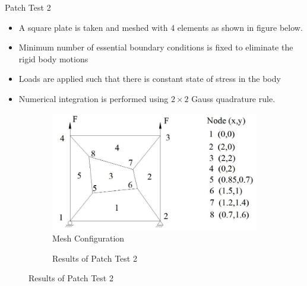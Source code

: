 \documentclass{beamer}
\begin{document}
\begin{frame}[t,fragile]{Patch Test 2}
    \vspace{-.4cm}
    \footnotesize
 \begin{itemize}
        \item A square plate is taken and meshed with 4 elements as shown in figure below. 
        \item Minimum number of essential boundary conditions is fixed to eliminate the rigid body motions
        \item Loads are applied such that there is constant state of stress in the body
        \item Numerical integration is performed using $2\times 2$ Gauss quadrature rule.
    \end{itemize}
    \begin{figure}
    \vspace{.5cm}
\begin{subfigure}{0.45\textwidth}
    \centering
    \includegraphics[scale=.2]{image2}
    \caption{\scriptsize Mesh Configuration }
\end{subfigure}
\begin{subfigure}{0.45\textwidth}
    \vspace{-.5cm}
     \centering
\caption{\scriptsize Results of Patch Test 2}
\end{subfigure}
\end{figure}
\end{frame}
\end{document}
